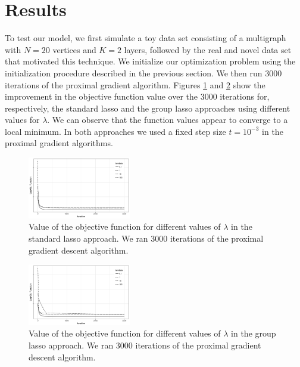 \documentclass{article}
\begin{document}
\section{Results}

To test our model, we first simulate a toy data set consisting of a multigraph with $N=20$ vertices and $K=2$ layers, followed by the real and novel data set that motivated this technique. We initialize our optimization problem using the initialization procedure described in the previous section. We then run $3000$ iterations of the proximal gradient algorithm. Figures \ref{fig:obj_lasso} and \ref{fig:obj_group} show the improvement in the objective function value over the 3000 iterations for, respectively, the standard lasso and the group lasso approaches using different values for $\lambda$. We can observe that the function values appear to converge to a local minimum. In both approaches we used a fixed step size $t=10^{-3}$ in the proximal gradient algorithms.


\begin{figure}[h!]
   \centering
   \includegraphics[width=0.4\textwidth]{plot_objective_individual} %
   \caption{Value of the objective function for different values of $\lambda$ in the standard lasso approach. We ran 3000 iterations of the proximal gradient descent algorithm.}
   \label{fig:obj_lasso}
\end{figure}

\begin{figure}[h!]
   \centering
   \includegraphics[width=0.4\textwidth]{plot_objective_group} %
   \caption{Value of the objective function for different values of $\lambda$ in the group lasso approach. We ran 3000 iterations of the proximal gradient descent algorithm.}
   \label{fig:obj_group}
\end{figure}
\end{document}
